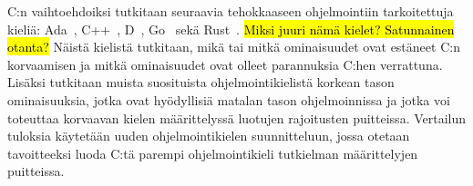 C:n vaihtoehdoiksi tutkitaan seuraavia tehokkaaseen ohjelmointiin tarkoitettuja
kieliä: Ada~\citep{ADA12}, C++~\citep{CPP17}, D~\citep{D}, Go~\citep{golang}
sekä Rust~\citep{rust}. \hl{Miksi juuri nämä kielet? Satunnainen otanta?}
Näistä kielistä tutkitaan, mikä tai mitkä ominaisuudet ovat estäneet C:n
korvaamisen ja mitkä ominaisuudet ovat olleet parannuksia C:hen verrattuna.
Lisäksi tutkitaan muista suosituista ohjelmointikielistä korkean tason
ominaisuuksia, jotka ovat hyödyllisiä matalan tason ohjelmoinnissa ja jotka voi
toteuttaa korvaavan kielen määrittelyssä luotujen rajoitusten puitteissa.
Vertailun tuloksia käytetään uuden ohjelmointikielen suunnitteluun, jossa
otetaan tavoitteeksi luoda C:tä parempi ohjelmointikieli tutkielman
määrittelyjen puitteissa.


%


